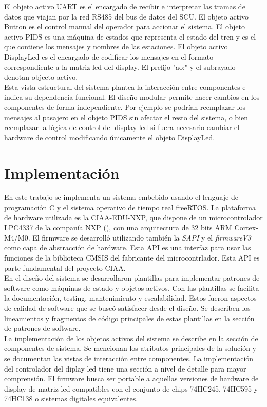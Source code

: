 El objeto activo UART es el encargado de recibir e interpretar las tramas de datos que viajan por la red RS485 del bus de datos del SCU. El objeto activo Button es el control manual del operador para accionar el sistema. El objeto activo PIDS es una máquina de estados que representa el estado del tren y es el que contiene los mensajes y nombres de las estaciones. El objeto activo DisplayLed es el encargado de codificar los mensajes en el formato correspondiente a la matriz led del display. El prefijo "ao:" y el subrayado denotan objecto activo.\\

Esta vista estructural del sistema plantea la interacción entre componentes e indica su dependencia funcional. El diseño modular permite hacer cambios en los componentes de forma independiente. Por ejemplo se podrían reemplazar los mensajes al pasajero en el objeto PIDS sin afectar el resto del sistema, o bien reemplazar la lógica de control del display led si fuera necesario cambiar el hardware de control modificando únicamente el objeto DisplayLed.\\


\section{Implementación}
En este trabajo se implementa un sistema embebido usando el lenguaje de programación C y el sistema operativo de tiempo real freeRTOS. La plataforma de hardware utilizada es la CIAA-EDU-NXP, que dispone de un microcontrolador LPC4337 de la companía NXP (\cite{NXPLPC4337}), con una arquitectura de 32 bits ARM Cortex-M4/M0. El firmware se desarrolló utilizando también la \textit{SAPI} y el \textit{firmwareV3} \cite{firmwarev3} como capa de abstracción de hardware. Esta API es una interfaz para usar las funciones de la biblioteca CMSIS del fabricante del microcontrlador. Esta API es parte fundamental del proyecto CIAA.\\
 
En el diseño del sistema se desarrollaron plantillas para implementar patrones de software como máquinas de estado y objetos activos. Con las plantillas se facilita la documentación, testing, mantenimiento y escalabilidad. Estos fueron aspectos de calidad de software que se buscó satisfacer desde el diseño. Se describen los lineamientos y fragmentos de código principales de estas plantillas en la sección de patrones de software. \\

La implementación de los objetos activos del sistema se describe en la sección de componentes de sistema. Se mencionan los atributos principales de la solución y se documentan las vistas de interacción entre componentes. La implementación del controlador del diplay led tiene una sección a nivel de detalle para mayor comprensión. El firmware busca ser portable a aquellas versiones de hardware de display de matriz led compatibles con el conjunto de chips 74HC245, 74HC595 y 74HC138 o sistemas digitales equivalentes. \\



